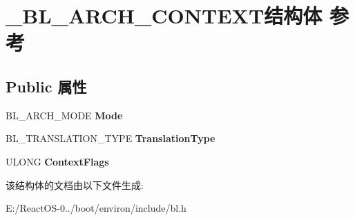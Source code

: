 \hypertarget{struct___b_l___a_r_c_h___c_o_n_t_e_x_t}{}\section{\+\_\+\+B\+L\+\_\+\+A\+R\+C\+H\+\_\+\+C\+O\+N\+T\+E\+X\+T结构体 参考}
\label{struct___b_l___a_r_c_h___c_o_n_t_e_x_t}
\subsection*{Public 属性}
\begin{DoxyCompactItemize}
\item 
\mbox{\label{struct___b_l___a_r_c_h___c_o_n_t_e_x_t_a8aea24d652306fcf1c9b151750d5d60f}} 
B\+L\+\_\+\+A\+R\+C\+H\+\_\+\+M\+O\+DE {\bfseries Mode}
\item 
\mbox{\label{struct___b_l___a_r_c_h___c_o_n_t_e_x_t_a31072d66010b4ec825f01d49e7dad911}} 
B\+L\+\_\+\+T\+R\+A\+N\+S\+L\+A\+T\+I\+O\+N\+\_\+\+T\+Y\+PE {\bfseries Translation\+Type}
\item 
\mbox{\label{struct___b_l___a_r_c_h___c_o_n_t_e_x_t_ab6e3a3624c49ced28a3fd9df5f4d081a}} 
U\+L\+O\+NG {\bfseries Context\+Flags}
\end{DoxyCompactItemize}


该结构体的文档由以下文件生成\+:\begin{DoxyCompactItemize}
\item 
E\+:/\+React\+O\+S-\/0../boot/environ/include/bl.\+h\end{DoxyCompactItemize}
